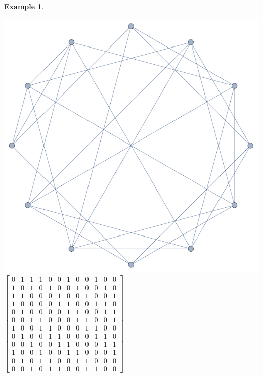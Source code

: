 \documentclass[preprint,12pt]{elsarticle}
\theoremstyle{definition}
\newtheorem{example}[thm]{Example}
\theoremstyle{remark}
\begin{document}
\begin{example}
\begin{center}
\includegraphics[scale=.7]{ex1_0.pdf}
$ \left[\begin{array}{llllllllllll}
0 & 1 & 1 & 1 & 0 & 0 & 1 & 0 &  0 & 1 & 0 & 0\\
1 & 0 & 1 & 0 & 1 & 0 & 0 & 1 & 0 &  0 &  1 &  0\\
1 & 1 & 0 & 0 & 0 & 1 & 0 & 0 & 1 & 0 & 0 & 1\\
1 & 0 & 0 & 0 & 0 & 1 & 1 & 0 & 0 & 1 & 1 & 0\\
0 & 1 & 0 & 0 & 0 & 0 & 1 & 1 & 0 & 0 & 1 & 1\\
0 & 0 & 1 & 1 & 0 & 0 & 0 & 1 & 1 & 0 & 0 & 1\\
1 & 0 & 0 & 1 & 1 & 0 & 0 & 0 & 1 & 1 & 0 & 0\\
0 & 1 & 0 & 0 & 1 & 1 & 0 & 0 & 0 & 1 & 1 & 0\\
0 & 0 & 1 & 0 & 0 & 1 & 1 & 0 & 0 & 0 & 1 & 1\\
1 & 0 & 0 & 1 & 0 & 0 & 1 & 1 & 0 & 0 & 0 & 1\\
0 & 1 & 0 & 1 & 1 & 0 & 0 & 1 & 1 & 0 & 0 & 0\\
0 & 0 & 1 & 0 & 1 & 1 & 0 & 0 & 1 & 1 & 0 & 0
\end{array}\right]$

\end{center}


\end{example}
\end{document}

